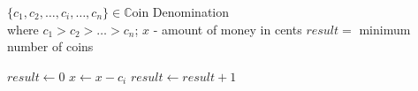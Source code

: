   \REQUIRE $\{c_1, c_2,\ldots, c_i, \ldots, c_n\} \in \mathbb{C}$oin Denomination \\
          where $c_1 > c_2 > \ldots > c_n$; $x$ - amount of money in cents
  \ENSURE $result = $ minimum number of coins

  \STATE $result \leftarrow 0$
  	   \STATE $x \leftarrow x - c_i$ 
       \STATE $result \leftarrow result + 1$
      \ENDWHILE
  \ENDFOR
